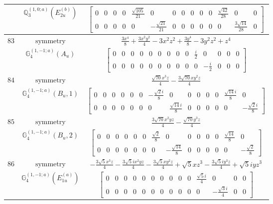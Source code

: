 \documentclass[fleqn,8pt,landscape]{jsarticle}
\begin{document}
\begin{longtable}{ccc}
$  $ & $ \mathbb{Q}_{3}^{(1,0;a)}(E_{2u}^{(b)}) $ & $ \begin{bmatrix} 0 & 0 & 0 & 0 & \frac{\sqrt{105}}{21} & 0 & 0 & 0 & 0 & 0 & 0 & \frac{\sqrt{42}}{28} & 0 & 0 \\ 0 & 0 & 0 & 0 & 0 & - \frac{\sqrt{21}}{21} & 0 & 0 & 0 & 0 & 0 & 0 & \frac{3 \sqrt{14}}{28} & 0 \end{bmatrix} $ \\ \hline
$ 83 $ & $ \text{symmetry} $ & $ \frac{3 x^{4}}{8} + \frac{3 x^{2} y^{2}}{4} - 3 x^{2} z^{2} + \frac{3 y^{4}}{8} - 3 y^{2} z^{2} + z^{4} $ \\
$  $ & $ \mathbb{G}_{4}^{(1,-1;a)}(A_{u}) $ & $ \begin{bmatrix} 0 & 0 & 0 & 0 & 0 & 0 & 0 & 0 & 0 & \frac{i}{2} & 0 & 0 & 0 & 0 \\ 0 & 0 & 0 & 0 & 0 & 0 & 0 & 0 & 0 & 0 & - \frac{i}{2} & 0 & 0 & 0 \end{bmatrix} $ \\ \hline
$ 84 $ & $ \text{symmetry} $ & $ \frac{\sqrt{70} x^{3} z}{4} - \frac{3 \sqrt{70} x y^{2} z}{4} $ \\
$  $ & $ \mathbb{G}_{4}^{(1,-1;a)}(B_{u},1) $ & $ \begin{bmatrix} 0 & 0 & 0 & 0 & 0 & 0 & - \frac{\sqrt{2} i}{8} & 0 & 0 & 0 & 0 & 0 & \frac{\sqrt{14} i}{8} & 0 \\ 0 & 0 & 0 & 0 & 0 & 0 & 0 & \frac{\sqrt{14} i}{8} & 0 & 0 & 0 & 0 & 0 & - \frac{\sqrt{2} i}{8} \end{bmatrix} $ \\ \hline
$ 85 $ & $ \text{symmetry} $ & $ \frac{3 \sqrt{70} x^{2} y z}{4} - \frac{\sqrt{70} y^{3} z}{4} $ \\
$  $ & $ \mathbb{G}_{4}^{(1,-1;a)}(B_{u},2) $ & $ \begin{bmatrix} 0 & 0 & 0 & 0 & 0 & 0 & \frac{\sqrt{2}}{8} & 0 & 0 & 0 & 0 & 0 & \frac{\sqrt{14}}{8} & 0 \\ 0 & 0 & 0 & 0 & 0 & 0 & 0 & - \frac{\sqrt{14}}{8} & 0 & 0 & 0 & 0 & 0 & - \frac{\sqrt{2}}{8} \end{bmatrix} $ \\ \hline
$ 86 $ & $ \text{symmetry} $ & $ - \frac{3 \sqrt{5} x^{3} z}{4} - \frac{3 \sqrt{5} i x^{2} y z}{4} - \frac{3 \sqrt{5} x y^{2} z}{4} + \sqrt{5} x z^{3} - \frac{3 \sqrt{5} i y^{3} z}{4} + \sqrt{5} i y z^{3} $ \\
$  $ & $ \mathbb{G}_{4}^{(1,-1;a)}(E_{1u}^{(a)}) $ & $ \begin{bmatrix} 0 & 0 & 0 & 0 & 0 & 0 & 0 & 0 & 0 & 0 & \frac{\sqrt{5} i}{4} & 0 & 0 & 0 \\ 0 & 0 & 0 & 0 & 0 & 0 & 0 & 0 & 0 & 0 & 0 & - \frac{\sqrt{3} i}{4} & 0 & 0 \end{bmatrix} $ \\ \hline

\end{longtable}
\end{document}
